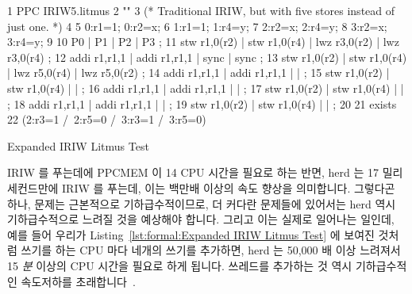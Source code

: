 \begin{listing*}[tb]
{ \scriptsize
\begin{verbbox}
 1 PPC IRIW5.litmus
 2 ""
 3 (* Traditional IRIW, but with five stores instead of just one. *)
 4 {
 5 0:r1=1; 0:r2=x;
 6 1:r1=1;         1:r4=y;
 7         2:r2=x; 2:r4=y;
 8         3:r2=x; 3:r4=y;
 9 }
10 P0           | P1           | P2           | P3           ;
11 stw r1,0(r2) | stw r1,0(r4) | lwz r3,0(r2) | lwz r3,0(r4) ;
12 addi r1,r1,1 | addi r1,r1,1 | sync         | sync         ;
13 stw r1,0(r2) | stw r1,0(r4) | lwz r5,0(r4) | lwz r5,0(r2) ;
14 addi r1,r1,1 | addi r1,r1,1 |              |              ;
15 stw r1,0(r2) | stw r1,0(r4) |              |              ;
16 addi r1,r1,1 | addi r1,r1,1 |              |              ;
17 stw r1,0(r2) | stw r1,0(r4) |              |              ;
18 addi r1,r1,1 | addi r1,r1,1 |              |              ;
19 stw r1,0(r2) | stw r1,0(r4) |              |              ;
20 
21 exists
22 (2:r3=1 /\ 2:r5=0 /\ 3:r3=1 /\ 3:r5=0)
\end{verbbox}
}
\centering
\theverbbox
\caption{Expanded IRIW Litmus Test}
\label{lst:formal:Expanded IRIW Litmus Test}
\end{listing*}

IRIW 를 푸는데에 PPCMEM 이 14 CPU 시간을 필요로 하는 반면, herd 는 17
밀리세컨드만에 IRIW 를 푸는데, 이는 백만배 이상의 속도 향상을 의미합니다.
그렇다곤 하나, 문제는 근본적으로 기하급수적이므로, 더 커다란 문제들에 있어서는
herd 역시 기하급수적으로 느려질 것을 예상해야 합니다.
그리고 이는 실제로 일어나는 일인데, 예를 들어 우리가
Listing~\ref{lst:formal:Expanded IRIW Litmus Test} 에 보여진 것처럼 쓰기를 하는
CPU 마다 네개의 쓰기를 추가하면, herd 는 50,000 배 이상 느려져서 15 \emph{분}
이상의 CPU 시간을 필요로 하게 됩니다.
쓰레드를 추가하는 것 역시 기하급수적인 속도저하를
초래합니다~\cite{PaulEMcKenney2014weakaxiom}.
\iffalse

However, where PPCMEM requires 14 CPU hours to solve IRIW, herd does so
in 17 milliseconds, which represents a speedup of more than six orders
of magnitude.
That said, the problem is exponential in nature, so we should expect
herd to exhibit exponential slowdowns for larger problems.
And this is exactly what happens, for example, if we add four more writes
per writing CPU as shown in
Listing~\ref{lst:formal:Expanded IRIW Litmus Test},
herd slows down by a factor of more than 50,000, requiring more than
15 \emph{minutes} of CPU time.
Adding threads also results in exponential
slowdowns~\cite{PaulEMcKenney2014weakaxiom}.
\fi

